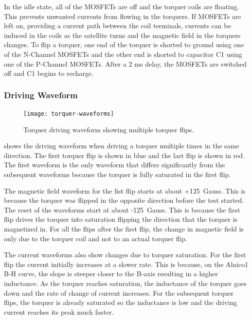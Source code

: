 In the idle state, all of the \acp{MOSFET} are off and the torquer coils are floating. This prevents unwanted currents from flowing in the torquers. If \acp{MOSFET} are left on, providing a current path between the coil terminals, currents can be induced in the coils as the satellite turns and the magnetic field in the torquers changes. To flip a torquer, one end of the torquer is shorted to ground using one of the N-Channel \acp{MOSFET} and the other end is shorted to capacitor C1 using one of the P-Channel \acp{MOSFET}. After a 2 ms delay, the \acp{MOSFET} are switched off and C1 begins to recharge.

\subsubsection{Driving Waveform}

\begin{figure}[H]
    \centering
    \texttt{[image: torquer-waveforms]}
    \caption{Torquer driving waveform showing multiple torquer flips.}
    \label{fig:driveWV}
\end{figure}

 shows the driving waveform when driving a torquer multiple times in the same direction. The first torquer flip is shown in blue and the last flip is shown in red. The first waveform is the only waveform that differs significantly from the subsequent waveforms because the torquer is fully saturated in the first flip.

The magnetic field waveform for the fist flip starts at about +125~Gauss. This is because the torquer was flipped in the opposite direction before the test started. The reset of the waveforms start at about -125~Gauss. This is because the first flip drives the torquer into saturation flipping the direction that the torquer is magnetized in. For all the flips after the first flip, the change in magnetic field is only due to the torquer coil and not to an actual torquer flip.

The current waveforms also show changes due to torquer saturation. For the first flip the current initially increases at a slower rate. This is because, on the Alnico1 B-H curve, the slope is steeper closer to the B-axis resulting in a higher inductance. As the torquer reaches saturation, the inductance of the torquer goes down and the rate of change of current increases. For the subsequent torquer flips, the torquer is already saturated so the inductance is low and the driving current reaches its peak much faster.

